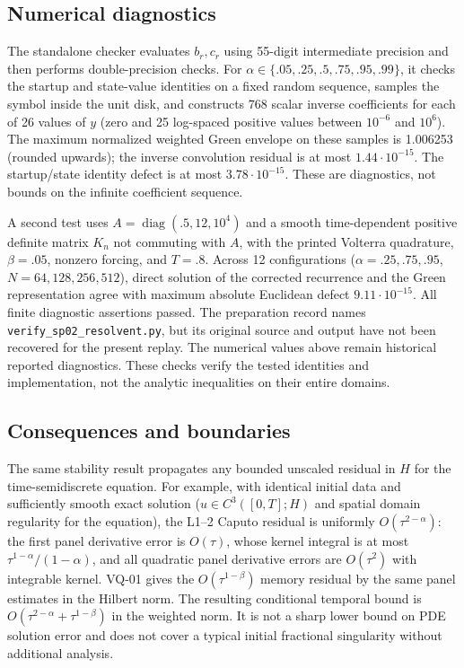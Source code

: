 \documentclass[11pt,a4paper]{amsart}
\theoremstyle{remark}
\theoremstyle{plain}
\theoremstyle{remark}
\numberwithin{equation}{section}
\begin{document}
\subsection{Numerical diagnostics}
The standalone checker evaluates $b_r,c_r$ using 55-digit intermediate precision and then performs double-precision checks. For $\alpha\in\{.05,.25,.5,.75,.95,.99\}$, it checks the startup and state-value identities on a fixed random sequence, samples the symbol inside the unit disk, and constructs 768 scalar inverse coefficients for each of 26 values of $y$ (zero and 25 log-spaced positive values between $10^{-6}$ and $10^6$). The maximum normalized weighted Green envelope on these samples is 1.006253 (rounded upwards); the inverse convolution residual is at most $1.44\cdot10^{-15}$. The startup/state identity defect is at most $3.78\cdot10^{-15}$. These are diagnostics, not bounds on the infinite coefficient sequence.

A second test uses $A=\operatorname{diag}(.5,12,10^4)$ and a smooth time-dependent positive definite matrix $K_n$ not commuting with $A$, with the printed Volterra quadrature, $\beta=.05$, nonzero forcing, and $T=.8$. Across 12 configurations ($\alpha=.25,.75,.95$, $N=64,128,256,512$), direct solution of the corrected recurrence and the Green representation agree with maximum absolute Euclidean defect $9.11\cdot10^{-15}$. All finite diagnostic assertions passed. The preparation record names \texttt{verify\_sp02\_resolvent.py}, but its original source and output have not been recovered for the present replay. The numerical values above remain historical reported diagnostics. These checks verify the tested identities and implementation, not the analytic inequalities on their entire domains.

\subsection{Consequences and boundaries}
The same stability result propagates any bounded unscaled residual in $H$ for the time-semidiscrete equation. For example, with identical initial data and sufficiently smooth exact solution ($u\in C^3([0,T];H)$ and spatial domain regularity for the equation), the L1--2 Caputo residual is uniformly $O(\tau^{2-\alpha})$: the first panel derivative error is $O(\tau)$, whose kernel integral is at most $\tau^{1-\alpha}/(1-\alpha)$, and all quadratic panel derivative errors are $O(\tau^2)$ with integrable kernel. VQ-01 gives the $O(\tau^{1-\beta})$ memory residual by the same panel estimates in the Hilbert norm. The resulting conditional temporal bound is $O(\tau^{2-\alpha}+\tau^{1-\beta})$ in the weighted norm. It is not a sharp lower bound on PDE solution error and does not cover a typical initial fractional singularity without additional analysis.
\end{document}
